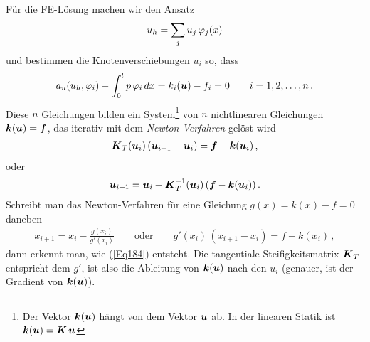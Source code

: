 F\"{u}r die FE-L\"{o}sung machen wir den Ansatz
\begin{align}
u_h = \sum_j u_j\,\varphi_j(x)
\end{align}
und bestimmen die Knotenverschiebungen $u_i $ so, dass
\begin{align}
a_u(u_h,\varphi_i) - \int_{0}^{l} p\,\varphi_i\,dx = k_i(\mbox{\boldmath $u$}) - f_i = 0 \qquad i = 1,2, \ldots, n\,.
\end{align}
Diese $n$ Gleichungen bilden ein System\footnote{Der Vektor $\mbox{\boldmath $k$}(\mbox{\boldmath $u$})$ h\"{a}ngt von dem Vektor $\mbox{\boldmath $u$}$ ab. In der linearen Statik ist $\mbox{\boldmath $k$}(\mbox{\boldmath $u$}) = \mbox{\boldmath $K$}\,\mbox{\boldmath $u$}$} von $n$ nichtlinearen Gleichungen $\mbox{\boldmath $k$}(\mbox{\boldmath $u$}) = \mbox{\boldmath $f$}$, das iterativ mit dem {\em Newton-Verfahren\/} gel\"{o}st wird
\begin{align}\label{Eq184}
\mbox{\boldmath $K$}_T(\mbox{\boldmath $u$}_i)\,(\mbox{\boldmath $u$}_{i+1} - \mbox{\boldmath $u$}_i) = \mbox{\boldmath $f$} - \mbox{\boldmath $k$}(\mbox{\boldmath $u$}_i)\,,
\end{align}
oder
\begin{align}
\mbox{\boldmath $u$}_{i+1}= \mbox{\boldmath $u$}_i + \mbox{\boldmath $K$}_T^{-1}(\mbox{\boldmath $u$}_i)\,(\mbox{\boldmath $f$} - \mbox{\boldmath $k$}(\mbox{\boldmath $u$}_i))\,.
\end{align}
Schreibt man das Newton-Verfahren f\"{u}r eine Gleichung $g(x) = k(x) - f = 0$ daneben
\begin{align}
x_{i+1} = x_i - \frac{g(x_i)}{g'(x_i)} \qquad \text{oder} \qquad g'(x_i)\,(x_{i + 1} -x_i) = f - k(x_i)\,,
\end{align}
dann erkennt man, wie (\ref{Eq184}) entsteht. Die tangentiale Steifigkeitsmatrix $\mbox{\boldmath $K$}_T $
entspricht dem $g'$, ist also die Ableitung von $\mbox{\boldmath $k$}(\mbox{\boldmath $u$})$ nach den $u_i$ (genauer, ist der Gradient von $\mbox{\boldmath $k$}(\mbox{\boldmath $u$})$).

